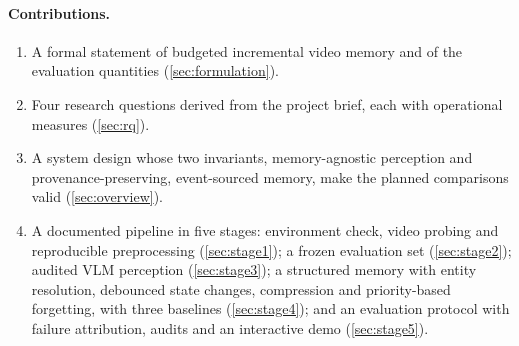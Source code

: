 \paragraph{Contributions.}
\begin{enumerate}[nosep]
  \item A formal statement of budgeted incremental video memory and of the
        evaluation quantities (\cref{sec:formulation}).
  \item Four research questions derived from the project brief, each with
        operational measures (\cref{sec:rq}).
  \item A system design whose two invariants, memory-agnostic perception and
        provenance-preserving, event-sourced memory, make the planned
        comparisons valid (\cref{sec:overview}).
  \item A documented pipeline in five stages: environment check,
        video probing and reproducible preprocessing
        (\cref{sec:stage1}); a frozen evaluation set (\cref{sec:stage2});
        audited VLM perception (\cref{sec:stage3}); a structured memory with
        entity resolution, debounced state changes, compression and
        priority-based forgetting, with three baselines (\cref{sec:stage4});
        and an evaluation protocol with failure attribution, audits and an
        interactive demo (\cref{sec:stage5}).
\end{enumerate}
